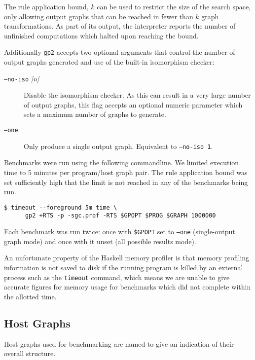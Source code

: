 The rule application bound, $k$ can be used to restrict the size of the search space, only allowing output graphs that can be reached in fewer than $k$ graph transformations. As part of its output, the interpreter reports the number of unfinished computations which halted upon reaching the bound.


Additionally \texttt{gp2} accepts two optional arguments that control the number of output graphs generated and use of the built-in isomorphism checker:

\begin{description}
	\item[\texttt{--no-iso} \textit{[n]}]  Disable the isomorphism checker. As this can result in a very large number of output graphs, this flag accepts an optional numeric parameter which sets a maximum number of graphs to generate.

	\item[\texttt{--one}] Only produce a single output graph. Equivalent to \texttt{--no-iso 1}.
\end{description}

Benchmarks were run using the following commandline. We limited execution time to 5 minutes per program/host graph pair. The rule application bound was set sufficiently high that the limit is not reached in any of the benchmarks being run.

\begin{verbatim}
$ timeout --foreground 5m time \
      gp2 +RTS -p -sgc.prof -RTS $GPOPT $PROG $GRAPH 1000000
\end{verbatim}

Each benchmark was run twice: once with \texttt{\$GPOPT} set to \texttt{--one} (single-output graph mode) and once with it unset (all possible results mode).

An unfortunate property of the Haskell memory profiler is that memory profiling information is not saved to disk if the running program is killed by an external process such as the \texttt{timeout} command, which means we are unable to give accurate figures for memory usage for benchmarks which did not complete within the allotted time.


\subsection{Host Graphs}
\label{subsec:hosts}

Host graphs used for benchmarking are named to give an indication of their overall structure.


